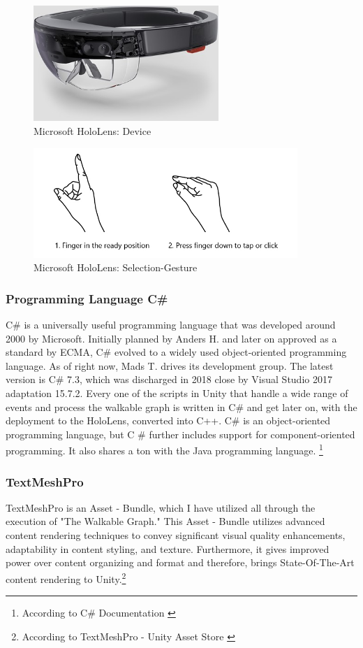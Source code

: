\documentclass[12pt,a4paper,oneside,american,parskip=half]{article}
\begin{document}
\begin{justify}
\begin{normalsize}
\begin{figure}[h]
\centering
\includegraphics[width=7cm]{holodevice.jpg}
\caption{Microsoft HoloLens: Device \cite{holodoc}}
\end{figure} \par

\begin{figure}[h]
\centering
\includegraphics[width=10cm]{airtap.png}
\caption{Microsoft HoloLens: Selection-Gesture \cite{holodoc2}}
\end{figure} \par


\subsubsection{Programming Language C\#}
C\# is a universally useful programming language that was developed around 2000 by Microsoft. Initially planned by  Anders H. and later on approved as a standard by ECMA, C\# evolved to a widely used object-oriented programming language. As of right now, Mads T. drives its development group. The latest version is C\# 7.3, which was discharged in 2018 close by Visual Studio 2017 adaptation 15.7.2. Every one of the scripts in Unity that handle a wide range of events and process the walkable graph is written in C\# and get later on, with the deployment to the HoloLens, converted into C++. C\# is an object-oriented programming language, but C \# further includes support for component-oriented programming. It also shares a ton with the Java programming language. \footnote{According to C\# Documentation \cite{csharp}}

\subsubsection{TextMeshPro}
TextMeshPro is an Asset - Bundle, which I have utilized all through the execution of  "The Walkable Graph." This Asset - Bundle utilizes advanced content rendering techniques to convey significant visual quality enhancements, adaptability in content styling, and texture. Furthermore, it gives improved power over content organizing and format and therefore, brings State-Of-The-Art content rendering to Unity.\footnote{According to TextMeshPro - Unity Asset Store \cite{tmpro}}


\end{normalsize}
\end{justify}
\end{document}
